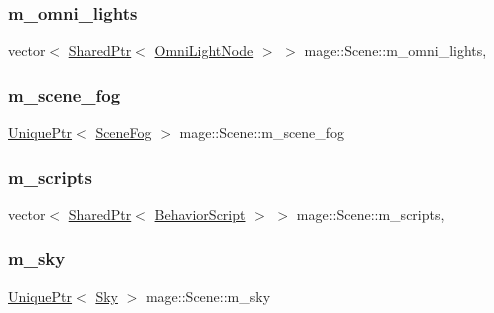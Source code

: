 \subsubsection{\texorpdfstring{m\+\_\+omni\+\_\+lights}{m\_omni\_lights}}
{\footnotesize\ttfamily vector$<$ \hyperlink{namespacemage_a1e01ae66713838a7a67d30e44c67703e}{Shared\+Ptr}$<$ \hyperlink{namespacemage_a1724c6e6b6b5ba535cdd967cbbb4a669}{Omni\+Light\+Node} $>$ $>$ mage\+::\+Scene\+::m\+\_\+omni\+\_\+lights\hspace{0.3cm}{\ttfamily [mutable]}, {\ttfamily [private]}}

\hypertarget{classmage_1_1_scene_a58f8d29322664c4c5895703a6cbc9000}{}\label{classmage_1_1_scene_a58f8d29322664c4c5895703a6cbc9000} 
\subsubsection{\texorpdfstring{m\+\_\+scene\+\_\+fog}{m\_scene\_fog}}
{\footnotesize\ttfamily \hyperlink{namespacemage_a3316d7143a973e37adf1110f2e80ca31}{Unique\+Ptr}$<$ \hyperlink{structmage_1_1_scene_fog}{Scene\+Fog} $>$ mage\+::\+Scene\+::m\+\_\+scene\+\_\+fog\hspace{0.3cm}{\ttfamily [private]}}

\hypertarget{classmage_1_1_scene_a84548bf6978f8955ce5892cb23536a4e}{}\label{classmage_1_1_scene_a84548bf6978f8955ce5892cb23536a4e} 
\subsubsection{\texorpdfstring{m\+\_\+scripts}{m\_scripts}}
{\footnotesize\ttfamily vector$<$ \hyperlink{namespacemage_a1e01ae66713838a7a67d30e44c67703e}{Shared\+Ptr}$<$ \hyperlink{classmage_1_1_behavior_script}{Behavior\+Script} $>$ $>$ mage\+::\+Scene\+::m\+\_\+scripts\hspace{0.3cm}{\ttfamily [mutable]}, {\ttfamily [private]}}

\hypertarget{classmage_1_1_scene_a90163a34ed39216b14175c4b799abd46}{}\label{classmage_1_1_scene_a90163a34ed39216b14175c4b799abd46} 
\subsubsection{\texorpdfstring{m\+\_\+sky}{m\_sky}}
{\footnotesize\ttfamily \hyperlink{namespacemage_a3316d7143a973e37adf1110f2e80ca31}{Unique\+Ptr}$<$ \hyperlink{structmage_1_1_sky}{Sky} $>$ mage\+::\+Scene\+::m\+\_\+sky\hspace{0.3cm}{\ttfamily [private]}}


